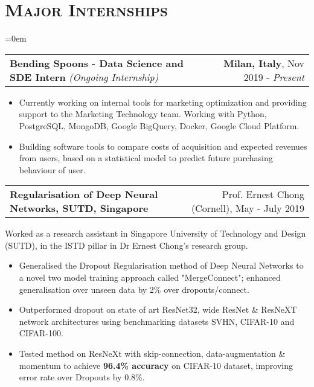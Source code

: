 \documentclass{article}
\makeatletter
\newcommand{\headerrow}[2]
{\begin{tabular*}{\linewidth}{l@{\extracolsep{\fill}}r}
	#1 &
	#2 \\
\end{tabular*}}
\newcommand{\tmpsection}[1]{}
\let\tmpsection=\section
\renewcommand{\section}[1]{\tmpsection*{\textsc{#1}}}
\makeatother
\begin{document}
\section{Major Internships}
\begin{list} {}{\leftmargin=0em}
\setlength{\leftmargin}{0pt}
      \item[]
    \headerrow {\textbf{Bending Spoons - Data Science and SDE Intern}  \textit{(Ongoing Internship)}}{\textbf{Milan, Italy},  Nov 2019 - \textit{Present}}
    \begin{itemize}
    \setlength\itemsep{0.0em}
        \item Currently working on internal tools for marketing optimization and providing support to the Marketing Technology team. Working with Python, PostgreSQL, MongoDB, Google BigQuery, Docker, Google Cloud Platform.
        \item Building software tools to compare costs of acquisition and expected revenues from users, based on a statistical model to predict future purchasing behaviour of user.
    \end{itemize}
    
    \item[]
    \headerrow {\textbf{Regularisation of Deep Neural Networks, SUTD, Singapore}}{Prof. Ernest Chong (Cornell), May - July 2019}
    Worked as a research assistant in Singapore University of Technology and Design (SUTD), in the ISTD pillar in Dr Ernest Chong's research group.
    \begin{itemize}
    \setlength\itemsep{0.0em}
        \item Generalised the Dropout Regularisation method of Deep Neural Networks to a novel two model training approach called "MergeConnect"; enhanced generalisation over unseen data by 2\% over dropouts/connect.
        \item Outperformed dropout on state of art ResNet32, wide ResNet \& ResNeXT network architectures using benchmarking datasets SVHN, CIFAR-10 and CIFAR-100.
        \item Tested method on ResNeXt with skip-connection, data-augmentation \& momentum to achieve \textbf{96.4\% accuracy} on CIFAR-10 dataset, improving error rate over Dropouts by 0.8\%.
    \end{itemize}
    

\end{list}
\end{document}
